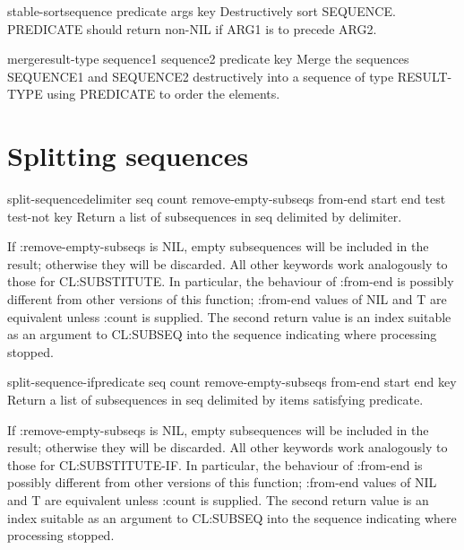 \documentclass[10pt,english]{book}
\begin{document}
\begin{function}{stable-sort}{sequence predicate \rest args \key key}
  Destructively sort SEQUENCE. PREDICATE should return non-NIL if
  ARG1 is to precede ARG2.
\end{function}

\begin{function}{merge}{result-type sequence1 sequence2 predicate \key key}
  Merge the sequences SEQUENCE1 and SEQUENCE2 destructively into a
  sequence of type RESULT-TYPE using PREDICATE to order the elements.
\end{function}

\section{Splitting sequences}
\label{sec:splitting-sequences}

\begin{function}{split-sequence}{delimiter seq \key count
    remove-empty-subseqs from-end start end test test-not key}
  Return a list of subsequences in seq delimited by delimiter.

  If :remove-empty-subseqs is NIL, empty subsequences will be included
  in the result; otherwise they will be discarded.  All other keywords
  work analogously to those for CL:SUBSTITUTE.  In particular, the
  behaviour of :from-end is possibly different from other versions of
  this function; :from-end values of NIL and T are equivalent unless
  :count is supplied. The second return value is an index suitable as an
  argument to CL:SUBSEQ into the sequence indicating where processing
  stopped.
\end{function}

\begin{function}{split-sequence-if}{predicate seq \key count
    remove-empty-subseqs from-end start end key}
  Return a list of subsequences in seq delimited by items satisfying
  predicate.

  If :remove-empty-subseqs is NIL, empty subsequences will be included
  in the result; otherwise they will be discarded.  All other keywords
  work analogously to those for CL:SUBSTITUTE-IF.  In particular, the
  behaviour of :from-end is possibly different from other versions of
  this function; :from-end values of NIL and T are equivalent unless
  :count is supplied. The second return value is an index suitable as an
  argument to CL:SUBSEQ into the sequence indicating where processing
  stopped.  
\end{function}
\end{document}
